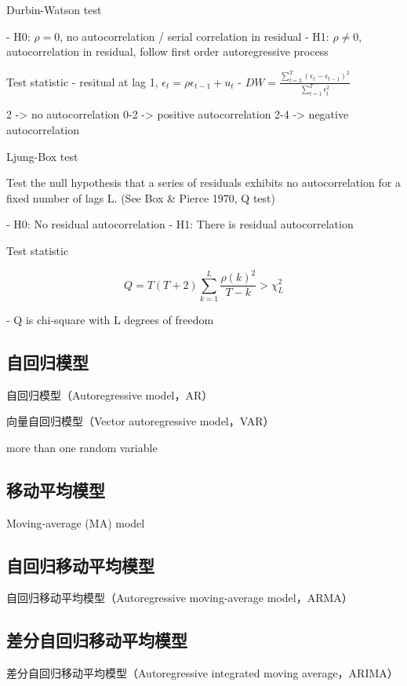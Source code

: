 \documentclass[11pt]{article}
\begin{document}
Durbin-Watson test

- H0: $\rho = 0$, no autocorrelation / serial correlation in residual
- H1: $\rho \neq 0$, autocorrelation in residual, follow first order autoregressive process

Test statistic
- resitual at lag 1, $\epsilon_t = \rho \epsilon_{t-1} + u_t$
- $DW = \frac{\sum_{t=2}^{T} (\epsilon_t - \epsilon_{t-1})^2}{\sum_{t=1}^{T} \epsilon^2_t}$

2 -> no autocorrelation
0-2 -> positive autocorrelation
2-4 -> negative autocorrelation

Ljung-Box test 

Test the null hypothesis that a series of residuals exhibits no autocorrelation for a fixed number of lags L. (See Box \& Pierce 1970, Q test)

- H0: No residual autocorrelation
- H1: There is residual autocorrelation

Test statistic

$$
Q = T(T+2) \sum^L_{k=1} \frac{\rho(k)^2}{T-k} > \chi^2_L
$$

- Q is chi-square with L degrees of freedom


\subsection{自回归模型}

自回归模型（Autoregressive model，AR）

向量自回归模型（Vector autoregressive model，VAR）
    
more than one random variable


\subsection{移动平均模型}
Moving-average (MA) model


\subsection{自回归移动平均模型}

自回归移动平均模型（Autoregressive moving-average model，ARMA）

\subsection{差分自回归移动平均模型}

差分自回归移动平均模型（Autoregressive integrated moving average，ARIMA）
\end{document}
